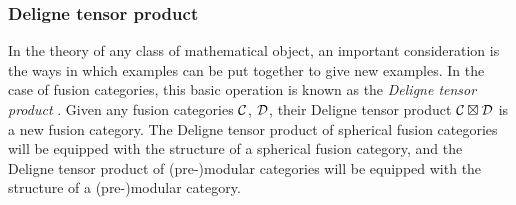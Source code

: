 \subsubsection{Deligne tensor product}


In the theory of any class of mathematical object, an important consideration is the ways in which examples can be put together to give new examples. In the case of fusion categories, this basic operation is known as the {\em Deligne tensor product} \cite{deligne2002categories}. Given any fusion categories ${\mathcal C}$, ${\mathcal D}$, their Deligne tensor product ${\mathcal C}\boxtimes {\mathcal D}$ is a new fusion category. The Deligne tensor product of spherical fusion categories will be equipped with the structure of a spherical fusion category, and the Deligne tensor product of (pre-)modular categories will be equipped with the structure of a (pre-)modular category.

